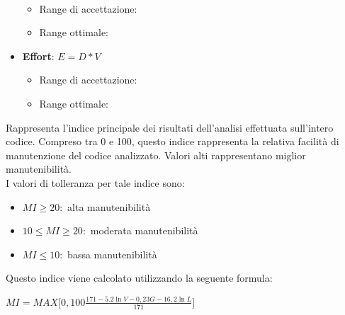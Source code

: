 \documentclass[a4paper,11pt]{article}
\begin{document}
\begin{itemize}
\begin{math}
\end{math}
\begin{itemize}
	\item Range di accettazione: \begin{math}[0 - 30]\end{math}
	\item Range ottimale: \begin{math}[0 - 15]\end{math}
	\end{itemize}
\item \textbf{Effort}: 
\begin{math}
E = D * V
\end{math}
\begin{itemize}
	\item Range di accettazione: \begin{math}[0 - 400]\end{math}
	\item Range ottimale: \begin{math}[0 - 300]\end{math}
	\end{itemize}
\end{itemize} 
 Rappresenta l'indice principale dei risultati dell'analisi effettuata sull'intero codice. Compreso tra 0 e 100, questo indice rappresenta la relativa facilità di manutenzione del codice analizzato. Valori alti rappresentano miglior manutenibilità.\\
I valori di tolleranza per tale indice sono:
\begin{itemize}
\item  \begin{math} MI \ge 20: \end{math} alta manutenibilità
\item \begin{math}10 \leq MI \geq 20: \end{math} moderata manutenibilità
\item \begin{math}MI \leq 10: \end{math} bassa manutenibilità
\end{itemize}
Questo indice viene calcolato utilizzando la seguente formula: \\
\begin{center}
\begin{math}
MI = MAX\bigg[ 0,100 \frac{171-5.2\ln V - 0,23G - 16,2\ln L}{171} \bigg]
\end{math}
\end{center}
\end{document}
